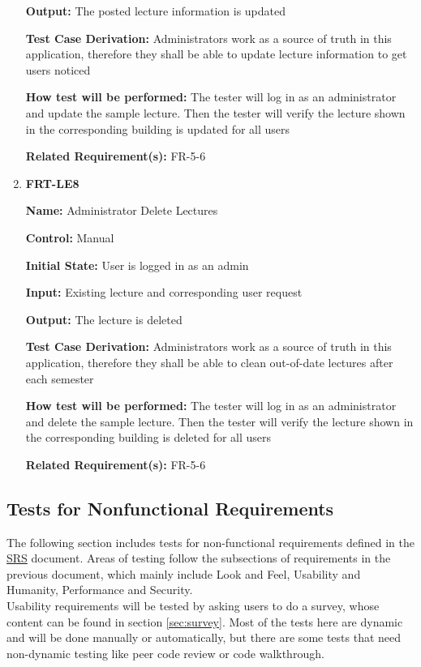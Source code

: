 \documentclass[12pt, titlepage]{article}
\begin{document}
\begin{enumerate}
\textbf{Output:} The posted lecture information is updated

\textbf{Test Case Derivation:} Administrators work as a source of truth in this application, therefore they shall be able to update lecture information to get users noticed
					
\textbf{How test will be performed:} The tester will log in as an administrator and update the sample lecture. Then the tester will verify the lecture shown in the corresponding building is updated for all users

\textbf{Related Requirement(s):} FR-5-6

\item{\textbf{FRT-LE8}}

\textbf{Name:} Administrator Delete Lectures

\textbf{Control:} Manual
					
\textbf{Initial State:} User is logged in as an admin

\textbf{Input:} Existing lecture and corresponding user request
					
\textbf{Output:} The lecture is deleted

\textbf{Test Case Derivation:} Administrators work as a source of truth in this application, therefore they shall be able to clean out-of-date lectures after each semester
					
\textbf{How test will be performed:} The tester will log in as an administrator and delete the sample lecture. Then the tester will verify the lecture shown in the corresponding building is deleted for all users

\textbf{Related Requirement(s):} FR-5-6
\end{enumerate}

\subsection{Tests for Nonfunctional Requirements}
\label{sec:nonfunctional}

The following section includes tests for non-functional requirements defined in the \href{https://github.com/beatlepie/4G06CapstoneProjectTeam2/blob/main/docs/SRS-Volere/SRS.pdf}{SRS} document. Areas of testing follow the subsections of requirements in the previous document, which mainly include Look and Feel, Usability and Humanity, Performance and Security.\\ Usability requirements will be tested by asking users to do a survey, whose content can be found in section \ref{sec:survey}. Most of the tests here are dynamic and will be done manually or automatically, but there are some tests that need non-dynamic testing like peer code review or code walkthrough.
\end{document}
